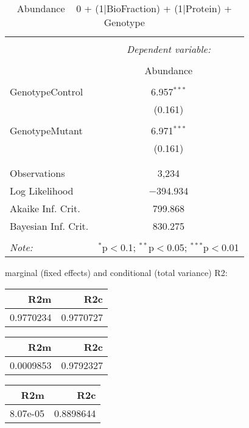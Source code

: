 \documentclass[11pt]{report}
\begin{document}
\begin{table}[!htbp] \centering 
  \caption{Abundance ~ 0 + (1|BioFraction) + (1|Protein) + Genotype} 
  \label{} 
\begin{tabular}{@{\extracolsep{5pt}}lc} 
\\[-1.8ex]\hline 
\hline \\[-1.8ex] 
 & \multicolumn{1}{c}{\textit{Dependent variable:}} \\ 
\cline{2-2} 
\\[-1.8ex] & Abundance \\ 
\hline \\[-1.8ex] 
 GenotypeControl & 6.957$^{***}$ \\ 
  & (0.161) \\ 
  & \\ 
 GenotypeMutant & 6.971$^{***}$ \\ 
  & (0.161) \\ 
  & \\ 
\hline \\[-1.8ex] 
Observations & 3,234 \\ 
Log Likelihood & $-$394.934 \\ 
Akaike Inf. Crit. & 799.868 \\ 
Bayesian Inf. Crit. & 830.275 \\ 
\hline 
\hline \\[-1.8ex] 
\textit{Note:}  & \multicolumn{1}{r}{$^{*}$p$<$0.1; $^{**}$p$<$0.05; $^{***}$p$<$0.01} \\ 
\end{tabular} 
\end{table} 
marginal (fixed effects) and conditional (total variance) R2:

\begin{tabular}{r|r}
\hline
R2m & R2c\\
\hline
0.9770234 & 0.9770727\\
\hline
\end{tabular}

\begin{tabular}{r|r}
\hline
R2m & R2c\\
\hline
0.0009853 & 0.9792327\\
\hline
\end{tabular}

\begin{tabular}{r|r}
\hline
R2m & R2c\\
\hline
8.07e-05 & 0.8898644\\
\hline
\end{tabular}
\end{document}
